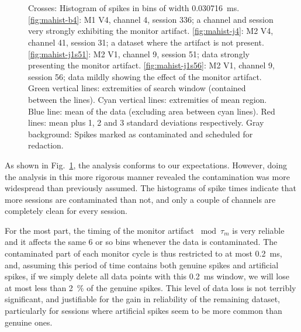 \begin{figure}[htbp]
   ~~
   \\
   ~~
   \caption{Crosses: Histogram of spikes in bins of width \SI{0.030716}{ms}.
\ref{fig:mahist-b4}: \ac{M1} \ac{V4}, channel 4, session 336; a channel and session very strongly exhibiting the monitor artifact.
\ref{fig:mahist-j4}: \ac{M2} \ac{V4}, channel 41, session 31; a dataset where the artifact is not present.
\ref{fig:mahist-j1s51}: \ac{M2} \ac{V1}, channel 9, session 51; data strongly presenting the monitor artifact.
\ref{fig:mahist-j1s56}: \ac{M2} \ac{V1}, channel 9, session 56; data mildly showing the effect of the monitor artifact.
Green vertical lines: extremities of search window (contained between the lines).
Cyan vertical lines: extremities of mean region.
Blue line: mean of the data (excluding area between cyan lines).
Red lines: mean plus 1, 2 and 3 standard deviations respectively.
Gray background: Spikes marked as contaminated and scheduled for redaction.
}
   \label{fig:mahist}
\end{figure}


As shown in Fig.~\ref{fig:mahist}, the analysis conforms to our expectations.
However, doing the analysis in this more rigorous manner revealed the contamination was more widespread than previously assumed.
The histograms of spike times indicate that more sessions are contaminated than not, and only a couple of channels are completely clean for every session.

For the most part, the timing of the monitor artifact $\bmod \tau_m$ is very reliable and it affects the same 6 or so bins whenever the data is contaminated.
The contaminated part of each monitor cycle is thus restricted to at most \SI{0.2}{ms}, and, assuming this period of time contains both genuine spikes and artificial spikes, if we simply delete all data points with this \SI{0.2}{ms} window, we will lose at most less than \SI{2}{\percent} of the genuine spikes.
This level of data loss is not terribly significant, and justifiable for the gain in reliability of the remaining dataset, particularly for sessions where artificial spikes seem to be more common than genuine ones.

